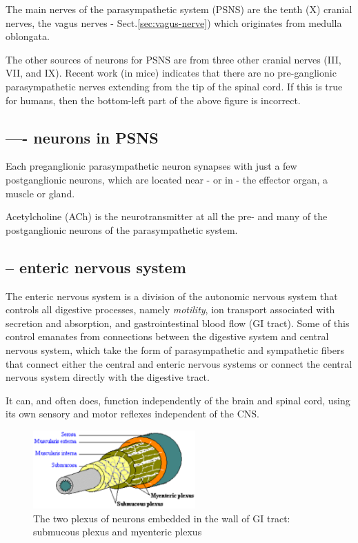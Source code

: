 The main nerves of the parasympathetic system (PSNS) are the tenth (X) cranial
nerves, the vagus nerves - Sect.\ref{sec:vagus-nerve}) which originates from medulla
oblongata.

The other sources of neurons for PSNS are from three other cranial nerves (III,
VII, and IX). Recent work (in mice) indicates that there are no pre-ganglionic
parasympathetic nerves extending from the tip of the spinal cord. If this is
true for humans, then the bottom-left part of the above figure is incorrect.

\subsection{---- neurons in PSNS}

Each preganglionic parasympathetic neuron synapses with just a few
postganglionic neurons, which are located near - or in - the effector organ, a
muscle or gland. 

Acetylcholine (ACh) is the neurotransmitter at all the pre- and many of the
postganglionic neurons of the parasympathetic system.

\subsection{-- enteric nervous system}
\label{sec:enteric-division}
\label{sec:enteric-nervous-system}

The enteric nervous system is a division of the autonomic nervous system that
controls  all digestive processes, namely {\it motility}, ion transport
associated with secretion and absorption, and gastrointestinal blood flow (GI
tract).  Some of this control emanates from connections between the digestive
system and central nervous system, which  take the form of parasympathetic and
sympathetic fibers that connect either the central and enteric nervous systems
or connect the central nervous system directly with the digestive tract.

It can, and often does, function independently of the brain and spinal cord,
using its own sensory and motor reflexes independent of the CNS.

\begin{figure}[h]
\centerline{\includegraphics[height=3cm]{./images/enteric-division.eps}}
\caption{The two plexus of neurons embedded in the wall of GI tract:
submucous plexus and myenteric plexus}\label{fig:enteric-division}
\end{figure} 

